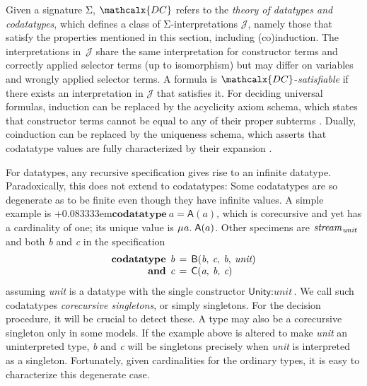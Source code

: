 \documentclass[smallcondensed,draft]{svjour3}
\newcommand\MU{\vvthinspace\mu\vvthinspace}
\newcommand\Sig{\mathrm{\Sigma}}
\newcommand\keyw[1]{\textbf{#1}}
\newcommand\const[1]{\textsf{#1}}
\newcommand\ty[1]{\textit{#1}}
\newcommand{\JJJJ}{\mathcal{\!J\!}}
\newcommand{\thD}{\mathcalx{DC}}
\newcommand\vvthinspace{\kern+0.041667em}
\newcommand\vthinspace{\kern+0.083333em}
\begin{document}
Given a signature $\Sig$, $\thD$ refers to the \emph{theory of
datatypes and codatatypes},
which %
defines a class of $\Sig$-interpretations $\JJJJ$,
namely those that satisfy the %
properties mentioned in this section, including (co)induction. The interpretations
in~$\JJJJ$ share the same interpretation for constructor terms and correctly
applied selector terms (up to isomorphism) %
but may differ on variables and wrongly applied selector terms.
A formula is $\thD$-\emph{satisfiable} if there
exists an interpretation in $\JJJJ$ that satisfies it.
%
For deciding universal formulas, induction can be replaced by the acyclicity
axiom schema, which states that constructor terms cannot be equal to
any of their proper subterms \cite{barrett-et-al-2007}.
Dually, coinduction can be replaced by the uniqueness schema, which
asserts that codatatype values are fully characterized by their %
expansion \cite[Theorem 8.1, 2$\,{\Leftrightarrow}\,$5]{rutten-2000}.




For datatypes, any recursive specification gives rise to an infinite datatype.
Paradoxically, this does not extend to codatatypes:
Some codatatypes are so degenerate as to be finite even though they
have infinite values. A simple example is
\vthinspace$\keyw{codatatype}~\ty{a} = \const{A}(\ty{a})$, which is corecursive
and yet has a cardinality of one;
its unique value is $\MU a.\; \const{A}(a)$. Other specimens are
$\ty{stream}_{\vthinspace\ty{unit}\,}$
and both \ty{b} and \ty{c} in the specification
\[\begin{aligned}[t]
      \keyw{codatatype}\;\, \ty{b} & \,=\, \const{B}(\ty{b},\: \ty{c},\: \ty{b},\: \ty{unit}) \\[-1\jot]
      \keyw{and}\;\, \ty{c} & \,=\, \const{C}(\ty{a},\: \ty{b},\: \ty{c})
\end{aligned}
\]
assuming \ty{unit} is a datatype with the single constructor $\const{Unity} :
\ty{unit}$. We call such codatatypes
\emph{corecursive singletons}, or simply singletons.
For the decision procedure, it will be
crucial to detect these. %
A type may also be a corecursive singleton only in some models. If the example
above is altered to make \ty{unit} an uninterpreted type, \ty{b} and \ty{c} will be
singletons precisely when \ty{unit} is interpreted as a singleton.
Fortunately, given cardinalities for the ordinary types,
it is easy to characterize this degenerate case.
\end{document}
